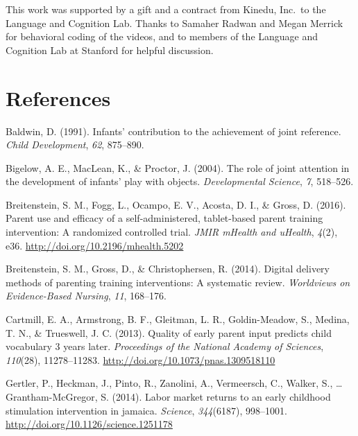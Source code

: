 \documentclass[man,floatsintext]{apa6}
\begin{document}
This work was supported by a gift and a contract from Kinedu, Inc.~to the Language and Cognition Lab.
Thanks to Samaher Radwan and Megan Merrick for behavioral coding of the videos, and to members of the Language and Cognition Lab at Stanford for helpful discussion.

\newpage

\hypertarget{references}{%
\section{References}\label{references}}

\begingroup
\setlength{\parindent}{-0.5in}
\setlength{\leftskip}{0.5in}

\hypertarget{refs}{}
\leavevmode\hypertarget{ref-Baldwin1991}{}%
Baldwin, D. (1991). Infants' contribution to the achievement of joint reference. \emph{Child Development}, \emph{62}, 875--890.

\leavevmode\hypertarget{ref-Bigelow2004}{}%
Bigelow, A. E., MacLean, K., \& Proctor, J. (2004). The role of joint attention in the development of infants' play with objects. \emph{Developmental Science}, \emph{7}, 518--526.

\leavevmode\hypertarget{ref-Breitenstein2016}{}%
Breitenstein, S. M., Fogg, L., Ocampo, E. V., Acosta, D. I., \& Gross, D. (2016). Parent use and efficacy of a self-administered, tablet-based parent training intervention: A randomized controlled trial. \emph{JMIR mHealth and uHealth}, \emph{4}(2), e36. \url{http://doi.org/10.2196/mhealth.5202}

\leavevmode\hypertarget{ref-Breitenstein2014}{}%
Breitenstein, S. M., Gross, D., \& Christophersen, R. (2014). Digital delivery methods of parenting training interventions: A systematic review. \emph{Worldviews on Evidence-Based Nursing}, \emph{11}, 168--176.

\leavevmode\hypertarget{ref-Cartmill2013}{}%
Cartmill, E. A., Armstrong, B. F., Gleitman, L. R., Goldin-Meadow, S., Medina, T. N., \& Trueswell, J. C. (2013). Quality of early parent input predicts child vocabulary 3 years later. \emph{Proceedings of the National Academy of Sciences}, \emph{110}(28), 11278--11283. \url{http://doi.org/10.1073/pnas.1309518110}

\leavevmode\hypertarget{ref-Jamaica2014}{}%
Gertler, P., Heckman, J., Pinto, R., Zanolini, A., Vermeersch, C., Walker, S., \ldots{} Grantham-McGregor, S. (2014). Labor market returns to an early childhood stimulation intervention in jamaica. \emph{Science}, \emph{344}(6187), 998--1001. \url{http://doi.org/10.1126/science.1251178}
\end{document}
